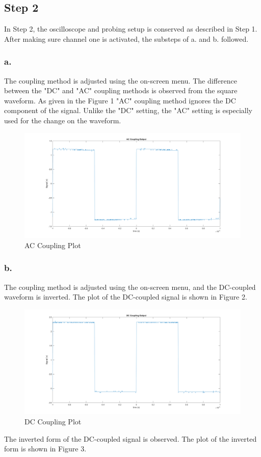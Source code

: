 \documentclass[letterpaper,12pt]{article}
\begin{document}
\subsection{Step 2}
In Step 2, the oscilloscope and probing setup is conserved as described in Step 1. After making sure channel one is activated, the substeps of a. and b. followed.
\subsubsection{a.}
The coupling method is adjusted using the on-screen menu. The difference between the "DC" and "AC" coupling methods is observed from the square waveform. As given in the Figure 1 "AC" coupling method ignores the DC component of the signal. Unlike the "DC" setting, the "AC" setting is especially used for the change on the waveform.
\begin{figure}[H]
	\caption{AC Coupling Plot}
	\centering
	\includegraphics[width=1\textwidth]{2a.png}
\end{figure}

\subsubsection{b.}
The coupling method is adjusted using the on-screen menu, and the DC-coupled waveform is inverted. The plot of the DC-coupled signal is shown in Figure 2.

\begin{figure}[H]
	\caption{DC Coupling Plot}
	\centering
	\includegraphics[width=1\textwidth]{2b1.png}
\end{figure}
The inverted form of the DC-coupled signal is observed. The plot of the inverted form is shown in Figure 3.
\end{document}
